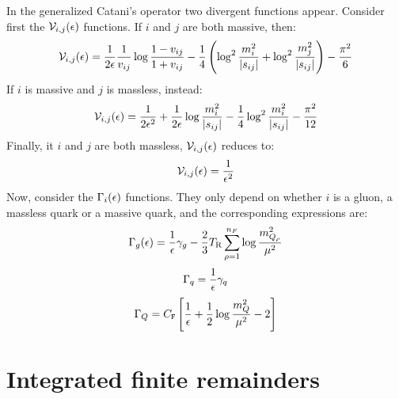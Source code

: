 In the generalized Catani's operator  two divergent functions appear. Consider first the $ \mathcal{V}_{i,j}(\epsilon) $ functions. If $ i $ and $ j $ are both massive, then:
\begin{equation}
  \mathcal{V}_{i,j}(\epsilon) = \frac{1}{2\epsilon} \frac{1}{v_{ij}} \log \frac{1 - v_{ij}}{1 + v_{ij}} - \frac{1}{4} \left( \log^2 \frac{m_i^2}{\left\lvert s_{ij}\right\rvert} + \log^2 \frac{m_j^2}{\left\lvert s_{ij}\right\rvert} \right) - \frac{\pi^2}{6}
  \label{eq:n-mm}
\end{equation}
If $ i $ is massive and $ j $ is massless, instead:
\begin{equation}
  \mathcal{V}_{i,j}(\epsilon) = \frac{1}{2\epsilon^2} + \frac{1}{2\epsilon} \log \frac{m_i^2}{\left\lvert s_{ij}\right\rvert} - \frac{1}{4} \log^2 \frac{m_i^2}{\left\lvert s_{ij}\right\rvert} - \frac{\pi^2}{12}
  \label{eq:n-mnm}
\end{equation}
Finally, it $ i $ and $ j $ are both massless, $ \mathcal{V}_{i,j}(\epsilon) $ reduces to:
\begin{equation}
  \mathcal{V}_{i,j}(\epsilon) = \frac{1}{\epsilon^2}
  \label{eq:n-nmnm}
\end{equation}
Now, consider the $ \Gamma_i(\epsilon) $ functions. They only depend on whether $ i $ is a gluon, a massless quark or a massive quark, and the corresponding expressions are:
\begin{equation}
  \Gamma_g(\epsilon) = \frac{1}{\epsilon} \gamma_g - \frac{2}{3} T_\text{R} \sum_{\rho = 1}^{n_F} \log \frac{m_{Q_\rho}^2}{\mu^2}
  \label{eq:g-g}
\end{equation}
\begin{equation}
  \Gamma_q = \frac{1}{\epsilon} \gamma_q
  \label{eq:g-q}
\end{equation}
\begin{equation}
  \Gamma_Q = C_\mathtt{F} \left[ \frac{1}{\epsilon} + \frac{1}{2} \log \frac{m_Q^2}{\mu^2} - 2 \right]
  \label{eq:g-qm}
\end{equation}

\section{Integrated finite remainders}

